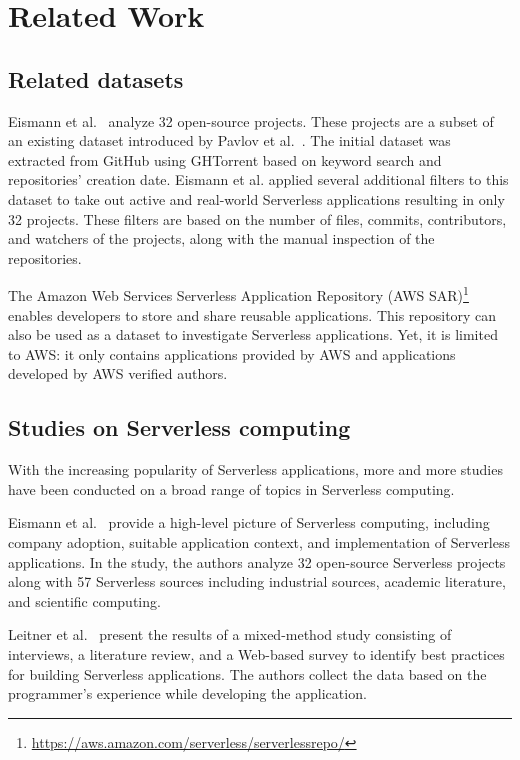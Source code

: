 
\section{Related Work}
\label{relatedwork}

\subsection{Related datasets}
Eismann et al.~\cite{eismann2020serverless} analyze
32 open-source projects. These projects are a subset of 
an existing dataset introduced by Pavlov et al.~\cite{pavlov2019serverless}. 
The initial dataset was extracted from GitHub using GHTorrent based on keyword 
search and repositories' creation date. Eismann et al. applied several additional 
filters to this dataset to take out active and real-world Serverless applications 
resulting in only 32 projects. These filters are based on the number of files, commits, 
contributors, and watchers of the projects, along with the manual inspection of 
the repositories.

The Amazon Web Services Serverless Application Repository
(AWS SAR)\footnote{\url{https://aws.amazon.com/serverless/serverlessrepo/}} 
enables developers to store and share reusable applications. 
This repository can also be used as a dataset to investigate Serverless 
applications. Yet, it is limited to AWS: it only contains 
applications provided by AWS and applications developed by 
AWS verified authors.


\subsection{Studies on Serverless computing}

With the increasing popularity of Serverless applications, 
more and more studies have been conducted on a broad range of topics in 
Serverless computing. 

Eismann et al.~\cite{eismann2020serverless} provide a  
high-level picture of Serverless computing, including 
company adoption, suitable application context, and implementation 
of Serverless applications.
In the study, the authors analyze 32 open-source Serverless projects 
along with 57 Serverless sources including industrial sources, academic literature, 
and scientific computing. 


Leitner et al.~\cite{leitner2019mixed} present the results of a mixed-method 
study consisting of interviews, a literature review, and a Web-based survey 
to identify best practices for building Serverless applications. 
The authors collect the data based on the programmer's experience while 
developing the application. 

